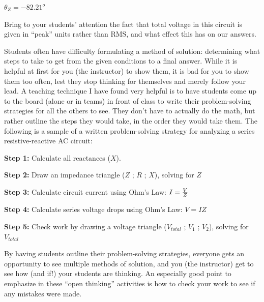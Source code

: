 $\theta_Z = -82.21^o$







Bring to your students' attention the fact that total voltage in this circuit is given in ``peak'' units rather than RMS, and what effect this has on our answers. 

\vskip 10pt

Students often have difficulty formulating a method of solution: determining what steps to take to get from the given conditions to a final answer.  While it is helpful at first for you (the instructor) to show them, it is bad for you to show them too often, lest they stop thinking for themselves and merely follow your lead.  A teaching technique I have found very helpful is to have students come up to the board (alone or in teams) in front of class to write their problem-solving strategies for all the others to see.  They don't have to actually do the math, but rather outline the steps they would take, in the order they would take them.  The following is a sample of a written problem-solving strategy for analyzing a series resistive-reactive AC circuit:

\vskip 10pt

\goodbreak

{\bf Step 1:} Calculate all reactances ($X$).

{\bf Step 2:} Draw an impedance triangle ($Z$ ; $R$ ; $X$), solving for $Z$

{\bf Step 3:} Calculate circuit current using Ohm's Law: $I = {V \over Z}$

{\bf Step 4:} Calculate series voltage drops using Ohm's Law: $V = {I Z}$

{\bf Step 5:} Check work by drawing a voltage triangle ($V_{total}$ ; $V_1$ ; $V_2$), solving for $V_{total}$

\vskip 10pt

By having students outline their problem-solving strategies, everyone gets an opportunity to see multiple methods of solution, and you (the instructor) get to see how (and if!) your students are thinking.  An especially good point to emphasize in these ``open thinking'' activities is how to check your work to see if any mistakes were made.




